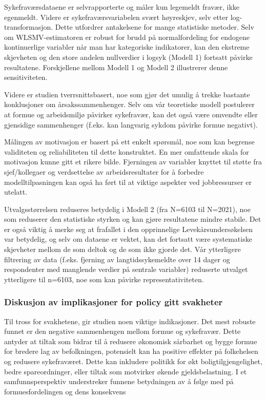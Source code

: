 \documentclass[
  12pt,
  a4paper,
  DIV=11,
  numbers=noendperiod]{scrartcl}
\begin{document}
Sykefraværsdataene er selvrapporterte og måler kun legemeldt fravær,
ikke egenmeldt. Videre er sykefraværsvariabelen svært høyreskjev, selv
etter log-transformasjon. Dette utfordrer antakelsene for mange
statistiske metoder. Selv om WLSMV-estimatoren er robust for brudd på
normalfordeling for endogene kontinuerlige variabler når man har
kategoriske indikatorer, kan den ekstreme skjevheten og den store
andelen nullverdier i logsyk (Modell 1) fortsatt påvirke resultatene.
Forskjellene mellom Modell 1 og Modell 2 illustrerer denne
sensitiviteten.

Videre er studien tverrsnittsbasert, noe som gjør det umulig å trekke
bastante konklusjoner om årsakssammenhenger. Selv om vår teoretiske
modell postulerer at formue og arbeidsmiljø påvirker sykefravær, kan det
også være omvendte eller gjensidige sammenhenger (f.eks. kan langvarig
sykdom påvirke formue negativt).

Målingen av motivasjon er basert på ett enkelt spørsmål, noe som kan
begrense validiteten og reliabiliteten til dette konstruktet. En mer
omfattende skala for motivasjon kunne gitt et rikere bilde. Fjerningen
av variabler knyttet til støtte fra sjef/kollegaer og verdsettelse av
arbeidsresultater for å forbedre modelltilpasningen kan også ha ført til
at viktige aspekter ved jobbressurser er utelatt.

Utvalgsstørrelsen reduseres betydelig i Modell 2 (fra N=6103 til
N=2021), noe som reduserer den statistiske styrken og kan gjøre
resultatene mindre stabile. Det er også viktig å merke seg at frafallet
i den opprinnelige Levekårsundersøkelsen var betydelig, og selv om
dataene er vektet, kan det fortsatt være systematiske skjevheter mellom
de som deltok og de som ikke gjorde det. Vår ytterligere filtrering av
data (f.eks. fjerning av langtidssykemeldte over 14 dager og
respondenter med manglende verdier på sentrale variabler) reduserte
utvalget ytterligere til n=6103, noe som kan påvirke
representativiteten.

\subsubsection{Diskusjon av implikasjoner for policy gitt
svakheter}\label{diskusjon-av-implikasjoner-for-policy-gitt-svakheter}

Til tross for svakhetene, gir studien noen viktige indikasjoner. Det
mest robuste funnet er den negative sammenhengen mellom formue og
sykefravær. Dette antyder at tiltak som bidrar til å redusere økonomisk
sårbarhet og bygge formue for bredere lag av befolkningen, potensielt
kan ha positive effekter på folkehelsen og redusere sykefraværet. Dette
kan inkludere politikk for økt boligtilgjengelighet, bedre
spareordninger, eller tiltak som motvirker økende gjeldsbelastning. I et
samfunnsperspektiv understreker funnene betydningen av å følge med på
formuesfordelingen og dens konsekvens
\end{document}

